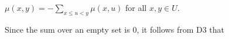 $\mu(x, y) = -\sum_{x \leq u < y} \mu(x, u)$ for all $x, y \in U$.

Since the sum over an empty set is 0, it follows from D3 that
